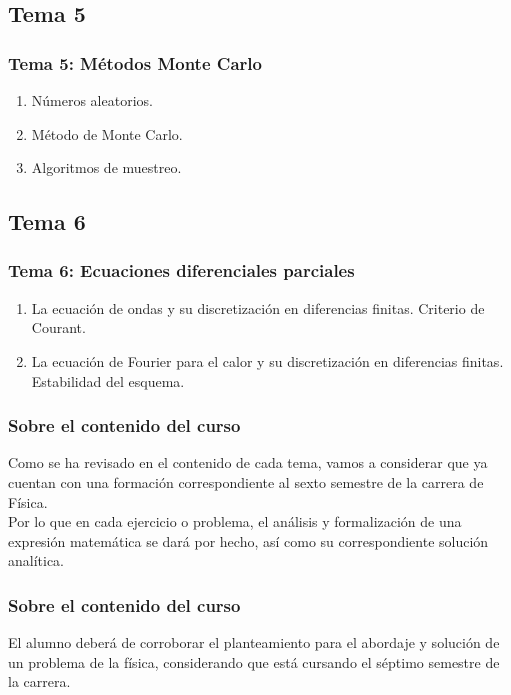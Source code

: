 \documentclass[12pt]{beamer}
\begin{document}
\subsection*{Tema 5}

\begin{frame}
\frametitle{\textbf{Tema 5: Métodos Monte Carlo}}
\begin{enumerate}[<+->]
\item Números aleatorios.
\item Método de Monte Carlo.
\item Algoritmos de muestreo.
\end{enumerate}
\end{frame}

\subsection*{Tema 6}

\begin{frame}
\frametitle{\textbf{Tema 6: Ecuaciones diferenciales parciales}}
\begin{enumerate}[<+->]
\item La ecuación de ondas y su discretización en diferencias finitas. Criterio de Courant.
\item La ecuación de Fourier para el calor y su discretización en diferencias finitas. Estabilidad del esquema.
\end{enumerate}
\end{frame}
\begin{frame}
\frametitle{Sobre el contenido del curso}
Como se ha revisado en el contenido de cada tema, vamos a considerar que ya cuentan con una formación correspondiente al sexto semestre de la carrera de Física.
\\
\bigskip
\pause
Por lo que en cada ejercicio o problema, el análisis y formalización de una expresión matemática se dará por hecho, así como su correspondiente solución analítica.
\end{frame}
\begin{frame}
\frametitle{Sobre el contenido del curso}
El alumno deberá de corroborar el planteamiento para el abordaje y solución de un problema de la física, considerando que está cursando el séptimo semestre de la carrera.
\end{frame}
\end{document}
